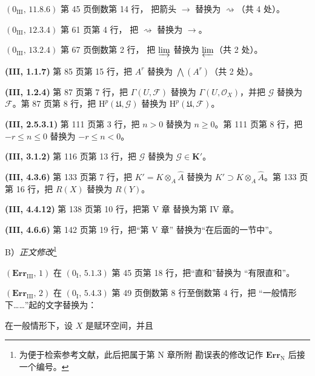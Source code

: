 \documentclass[UTF8,fontset=none,11pt,oneside,openany]{ctexbook}
\begin{document}
\noindent\textbf{$(0_{\mathrm{III}},\,11.8.6)$} 第 45 页倒数第 14 行，
把箭头 $\to$ 替换为 $\rightsquigarrow$（共 4 处）。

\noindent\textbf{$(0_{\mathrm{III}},\,12.3.4)$} 第 61 页第 4 行，
把 $\rightsquigarrow$ 替换为 $\to$。

\noindent\textbf{$(0_{\mathrm{III}},\,13.2.4)$} 第 67 页倒数第 2 行，
把 $\varinjlim$ 替换为 $\varprojlim$（共 2 处）。

\noindent\textbf{(III, 1.1.7)} 第 85 页第 15 行，把 $A^r$
替换为 $\bigwedge(A^r)$（共 2 处）。

\noindent\textbf{(III, 1.2.4)} 第 87 页第 7 行，把
$\Gamma(U,\mathscr F)$ 替换为 $\Gamma(U,\mathscr O_X)$，并把
$\mathscr G$ 替换为 $\mathscr F$。第 87 页第 8 行，把
$\mathrm H^p(\mathfrak U,\mathscr G)$ 替换为
$\mathrm H^p(\mathfrak U,\mathscr F)$。

\noindent\textbf{(III, 2.5.3.1)} 第 111 页第 3 行，把 $n>0$
替换为 $n\geq0$。第 111 页第 8 行，把 $-r\leq n\leq0$
替换为 $-r\leq n<0$。

\noindent\textbf{(III, 3.1.2)} 第 116 页第 13 行，把 $\mathscr G$
替换为 $\mathscr G\in\mathbf K'$。

\noindent\textbf{(III, 4.3.6)} 第 133 页第 7 行，把
$K'=K\otimes_A\widehat A$ 替换为
$K'\supset K\otimes_A\widehat A$。第 133 页第 16 行，把 $R(X)$
替换为 $R(Y)$。

\noindent\textbf{(III, 4.4.12)} 第 138 页第 10 行，把第 V 章
替换为第 IV 章。

\noindent\textbf{(III, 4.6.6)} 第 142 页第 19 行，把“第 V 章”
替换为“在后面的一节中”。

\begin{center}
B）\emph{正文修改}\footnote{为便于检索参考文献，此后把属于第 N 章所附
勘误表的修改记作 $\mathbf{Err}_{\mathrm N}$ 后接一个编号。}
\end{center}

\noindent\textbf{$(\mathbf{Err}_{\mathrm{III}},\,1)$} 在
$(0_{\mathrm I},\,5.1.3)$ 第 45 页第 18 行，把“直和”替换为
“有限直和”。

\noindent\textbf{$(\mathbf{Err}_{\mathrm{III}},\,2)$} 在
$(0_{\mathrm I},\,5.4.3)$ 第 49 页倒数第 8 行至倒数第 4 行，把
“一般情形下……”起的文字替换为：

在一般情形下，设 $X$ 是赋环空间，并且
\end{document}
